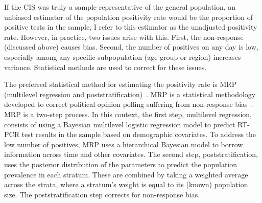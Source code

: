 \documentclass[thesis.tex]{subfiles}
\begin{document}
If the CIS was truly a sample representative of the general population, an unbiased estimator of the population positivity rate would be the proportion of positive tests in the sample; I refer to this estimator as the unadjusted positivity rate.
However, in practice, two issues arise with this.
First, the non-response (discussed above) causes bias.
Second, the number of positives on any day is low, especially among any specific subpopulation (\eg age group or region) increases variance.
Statistical methods are used to correct for these issues.

The preferred statistical method for estimating the positivity rate is MRP (multilevel regression and poststratification)~\autocite{cisMethodsONS,pouwelsCommunity}.
MRP is a statistical methodology developed to correct political opinion polling suffering from non-response bias~\autocite{gelmanMRT,gelmanPoststratication,parkMRP}.
MRP is a two-step process.
In this context, the first step, multilevel regression, consists of using a Bayesian multilevel logistic regression model to predict RT-PCR test results in the sample based on demographic covariates.
To address the low number of positives, MRP uses a hierarchical Bayesian model to borrow information across time and other covariates.
The second step, poststratification, uses the posterior distribution of the parameters to predict the population prevalence in each stratum.
These are combined by taking a weighted average across the strata, where a stratum's weight is equal to its (known) population size.
The poststratification step corrects for non-response bias.
\end{document}
